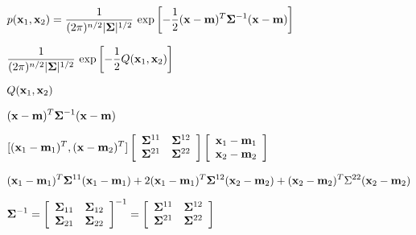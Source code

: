 \documentclass{article}
\def\lthtmlcheckvsize{\ifdim\ht\sizebox<\vsize 
  \ifdim\wd\sizebox<\hsize\expandafter\hfill\fi \expandafter\vfill
  \else\expandafter\vss\fi}%
\begin{document}
{\newpage\clearpage
{}%
$\displaystyle p({\bf x}_1,{\bf x}_2)=\frac{1}{(2\pi)^{n/2} |{\bf\Sigma}|^{1/2}}\,
\exp\left[-\frac{1}{2}({\bf x}-{\bf m})^T{\bf\Sigma}^{-1}({\bf x}-{\bf m}) \right]$%
\lthtmlindisplaymathZ
\lthtmlcheckvsize\clearpage}

{\newpage\clearpage
{}%
$\displaystyle \frac{1}{(2\pi)^{n/2}|{\bf\Sigma}|^{1/2}}\,\exp\left[-\frac{1}{2}Q({\bf x}_1,{\bf x}_2) \right]$%
\lthtmlindisplaymathZ
\lthtmlcheckvsize\clearpage}

{\newpage\clearpage
{}%
$\displaystyle Q({\bf x}_1,{\bf x}_2)$%
\lthtmlindisplaymathZ
\lthtmlcheckvsize\clearpage}

{\newpage\clearpage
{}%
$\displaystyle ({\bf x}-{\bf m})^T{\bf\Sigma}^{-1}({\bf x}-{\bf m})$%
\lthtmlindisplaymathZ
\lthtmlcheckvsize\clearpage}

{\newpage\clearpage
{}%
$\displaystyle [({\bf x}_1-{\bf m}_1)^T, ({\bf x}-{\bf m}_2)^T]
\left[\begin{array}{cc}{\bf\Sigma}^{11} & {\bf\Sigma}^{12}\\
{\bf\Sigma}^{21}&{\bf\Sigma}^{22}\end{array}\right]
\left[\begin{array}{c}{\bf x}_1-{\bf m}_1\\{\bf x}_2-{\bf m}_2\end{array}\right]$%
\lthtmlindisplaymathZ
\lthtmlcheckvsize\clearpage}

{\newpage\clearpage
{}%
$\displaystyle ({\bf x}_1-{\bf m}_1)^T{\bf\Sigma}^{11}({\bf x}_1-{\bf m}_1)+
2({\bf x}_1-{\bf m}_1)^T{\bf\Sigma}^{12}({\bf x}_2-{\bf m}_2)+
({\bf x}_2-{\bf m}_2)^T\Sigma^{22}({\bf x}_2-{\bf m}_2)$%
\lthtmlindisplaymathZ
\lthtmlcheckvsize\clearpage}

{\newpage\clearpage
{}%
$\displaystyle {\bf\Sigma}^{-1}=\left[\begin{array}{cc}{\bf\Sigma}_{11} & {\bf\Sigma}_{12}\\
{\bf\Sigma}_{21}&{\bf\Sigma}_{22}\end{array}\right]^{-1}=
\left[\begin{array}{cc}{\bf\Sigma}^{11} & {\bf\Sigma}^{12}\\
{\bf\Sigma}^{21}&{\bf\Sigma}^{22}\end{array}\right]$%
\lthtmlindisplaymathZ
\lthtmlcheckvsize\clearpage}
\end{document}
